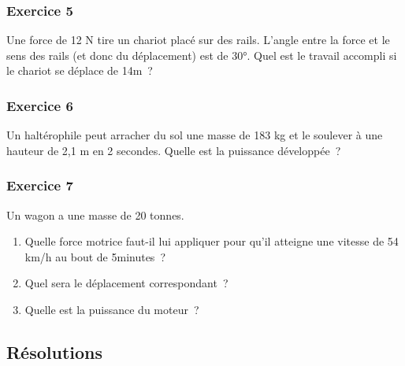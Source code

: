 \subsubsection*{Exercice 5}

Une force de 12 N tire un chariot placé sur des rails. L'angle entre la
force et le sens des rails (et donc du déplacement) est de 30°. Quel est
le travail accompli si le chariot se déplace de 14m~?

\subsubsection*{Exercice 6}

Un haltérophile peut arracher du sol une masse de 183 kg et le soulever
à une hauteur de 2,1 m en 2 secondes. Quelle est la puissance
développée~?

\subsubsection*{Exercice 7}

Un wagon a une masse de 20 tonnes.

\begin{enumerate}
\item   Quelle force motrice faut-il lui appliquer pour qu'il atteigne une
  vitesse de 54 km/h au bout de 5minutes~?
\item   Quel sera le déplacement correspondant~?
\item   Quelle est la puissance du moteur~?
\end{enumerate}


\subsection{Résolutions}

